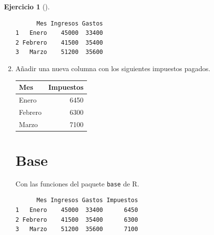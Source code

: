 \documentclass[
  spanish,
  a4paper,
]{scrreport}
\newenvironment{Shaded}{\begin{snugshade}}{\end{snugshade}}
\newcommand{\DecValTok}[1]{\textcolor[rgb]{0.68,0.00,0.00}{#1}}
\newcommand{\FunctionTok}[1]{\textcolor[rgb]{0.28,0.35,0.67}{#1}}
\newcommand{\NormalTok}[1]{\textcolor[rgb]{0.00,0.23,0.31}{#1}}
\newcommand{\OtherTok}[1]{\textcolor[rgb]{0.00,0.23,0.31}{#1}}
\newcommand{\SpecialCharTok}[1]{\textcolor[rgb]{0.37,0.37,0.37}{#1}}
\theoremstyle{definition}
\newtheorem{exercise}{Ejercicio}[chapter]
\theoremstyle{remark}
\begin{document}
\begin{exercise}[]
\begin{enumerate}
\begin{tcolorbox}
\begin{verbatim}
      Mes Ingresos Gastos
1   Enero    45000  33400
2 Febrero    41500  35400
3   Marzo    51200  35600
\end{verbatim}

  \end{tcolorbox}
\item
  Añadir una nueva columna con los siguientes impuestos pagados.

  \begin{longtable}[]{@{}lr@{}}
  \toprule\noalign{}
  Mes & Impuestos \\
  \midrule\noalign{}
  \endhead
  \bottomrule\noalign{}
  \endlastfoot
  Enero & 6450 \\
  Febrero & 6300 \\
  Marzo & 7100 \\
  \end{longtable}

  \begin{tcolorbox}[enhanced jigsaw, colback=white, opacityback=0, title=\textcolor{quarto-callout-tip-color}{\faLightbulb}\hspace{0.5em}{Solución}, toprule=.15mm, titlerule=0mm, breakable, toptitle=1mm, colframe=quarto-callout-tip-color-frame, coltitle=black, opacitybacktitle=0.6, bottomrule=.15mm, arc=.35mm, colbacktitle=quarto-callout-tip-color!10!white, leftrule=.75mm, bottomtitle=1mm, rightrule=.15mm, left=2mm]

  \section{Base}

  Con las funciones del paquete \texttt{base} de R.

\begin{Shaded}
\end{Shaded}

\begin{verbatim}
      Mes Ingresos Gastos Impuestos
1   Enero    45000  33400      6450
2 Febrero    41500  35400      6300
3   Marzo    51200  35600      7100
\end{verbatim}


\end{tcolorbox}
\end{enumerate}
\end{exercise}
\end{document}

